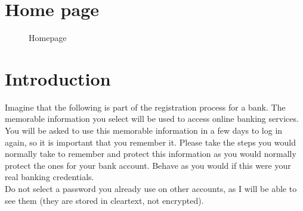   \section{Home page}
    \label{aps:homepage}
    \begin{figure}[H]
      \caption{Homepage}
      \label{fig:home}
    \end{figure}

  \section{Introduction}
    \label{aps:intro}
    Imagine that the following is part of the registration process for a bank. The memorable information you select will be used to access online banking services. You will be asked to use this memorable information in a few days to log in again, so it is important that you remember it. Please take the steps you would normally take to remember and protect this information as you would normally protect the ones for your bank account. Behave as you would if this were your real banking credentials.\\

    Do not select a password you already use on other accounts, as I will be able to see them (they are stored in cleartext, not encrypted).

